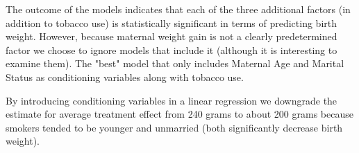 \documentclass[a4paper, 12pt]{article}
\begin{document}
The outcome of the models indicates that each of the three additional factors (in addition to tobacco use) is statistically significant in terms of predicting birth weight.  However, because maternal weight gain is not a clearly predetermined factor we choose to ignore models that include it (although it is interesting to examine them).  The "best" model that only includes Maternal Age and Marital Status as conditioning variables along with tobacco use.  \newline

By introducing conditioning variables in a linear regression we downgrade the estimate for average treatment effect from 240 grams to about 200 grams because smokers tended to be younger and unmarried (both significantly decrease birth weight).  
\end{document}
